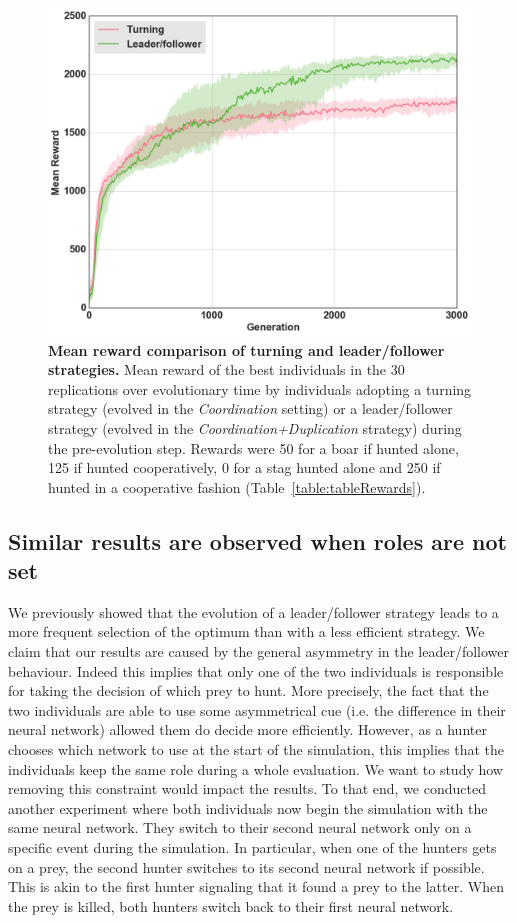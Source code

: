     \begin{figure}[h]
      \centering
        \includegraphics[width=0.75\linewidth]{fig/ArticleBio2/Fig6.png}
        \caption{\textbf{Mean reward comparison of turning and leader/follower strategies.}
        Mean reward of the best individuals in the $30$ replications over evolutionary time by individuals adopting a turning strategy (evolved in the \emph{Coordination} setting) or a leader/follower strategy (evolved in the \emph{Coordination+Duplication} strategy) during the pre-evolution step. Rewards were 50 for a boar if hunted alone, 125 if hunted cooperatively, 0 for a stag hunted alone and 250 if hunted in a cooperative fashion (Table~\ref{table:tableRewards}).}
      \label{fig:fitnessRecyclingLeadership}
    \end{figure}


  \subsection{Similar results are observed when roles are not set}
    We previously showed that the evolution of a leader/follower strategy leads to a more frequent selection of the optimum than with a less efficient strategy. We claim that our results are caused by the general asymmetry in the leader/follower behaviour. Indeed this implies that only one of the two individuals is responsible for taking the decision of which prey to hunt. More precisely, the fact that the two individuals are able to use some asymmetrical cue (i.e. the difference in their neural network) allowed them do decide more efficiently. However, as a hunter chooses which network to use at the start of the simulation, this implies that the individuals keep the same role during a whole evaluation.  We want to study how removing this constraint would impact the results. To that end, we conducted another experiment where both individuals now begin the simulation with the same neural network. They switch to their second neural network only on a specific event during the simulation. In particular, when one of the hunters gets on a prey, the second hunter switches to its second neural network if possible. This is akin to the first hunter signaling that it found a prey to the latter. When the prey is killed, both hunters switch back to their first neural network.


